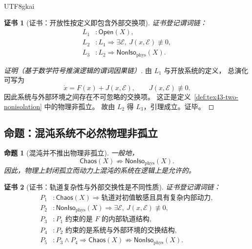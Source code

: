 \documentclass[12pt]{article}
\newtheorem{proposition}{命题}[section]
\newtheorem{Certificate}{证书}[section]
\begin{document}
\begin{CJK*}{UTF8}{gkai}
\begin{Certificate}[证书：开放性按定义即包含外部交换项]
\label{cert:tex43-open-phys-noniso}
证书登记谓词链：
\[
\begin{aligned}
  L_1 &: \mathsf{Open}(X),\\
  L_2 &: L_1 \Rightarrow \exists \mathcal E,\ J(x,\mathcal E)\not\equiv 0,\\
  L_3 &: L_2 \Rightarrow \mathsf{NonIso}_{\mathrm{phys}}(X).
\end{aligned}
\]
\end{Certificate}

\begin{proof}[证明（基于数学符号推演逻辑的谓词因果链）]
由 $L_1$ 与开放系统的定义，
总演化可写为
\[
  \dot x=F(x)+J(x,\mathcal E),
  \qquad
  J(x,\mathcal E)\not\equiv 0.
\]
因此系统与外部环境之间存在不可忽略的交换项。
这正是定义~\ref{def:tex43-two-nonisolation} 中的物理非孤立。
故由 $L_2$ 得 $L_3$，引理成立。证毕。
\end{proof}

\subsection{命题：混沌系统不必然物理非孤立}
\label{subsec:tex43-ch6-proposition}

\begin{proposition}[混沌并不推出物理非孤立]
\label{prop:tex43-chaos-not-phys-noniso}
一般地，
\[
  \mathsf{Chaos}(X)\not\Rightarrow \mathsf{NonIso}_{\mathrm{phys}}(X).
\]
因此，物理上封闭孤立而动力上混沌的系统在逻辑上是允许的。
\end{proposition}

\begin{Certificate}[证书：轨道复杂性与外部交换性是不同性质]
\label{cert:tex43-chaos-not-phys-noniso}
证书登记谓词链：
\[
\begin{aligned}
  P_1 &: \mathsf{Chaos}(X)\Rightarrow \text{轨道对初值敏感且具有复杂内部动力},\\
  P_2 &: \mathsf{NonIso}_{\mathrm{phys}}(X)\Rightarrow
         \exists \mathcal E,\ J(x,\mathcal E)\not\equiv 0,\\
  P_3 &: P_1 \text{ 约束的是 }F\text{ 的内部轨道结构},\\
  P_4 &: P_2 \text{ 约束的是系统与外部环境的交换结构},\\
  P_5 &: P_3\wedge P_4 \Rightarrow
         \mathsf{Chaos}(X)\not\Rightarrow \mathsf{NonIso}_{\mathrm{phys}}(X).
\end{aligned}
\]
\end{Certificate}


\end{CJK*}
\end{document}
